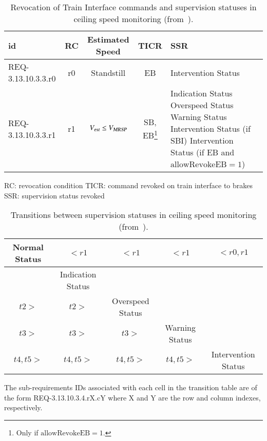 \begin{table}[htdp]
\caption{Revocation of Train Interface commands and supervision statuses in ceiling speed monitoring (from~\cite[Table~6]{ETCSSRS-Principles}).}
\footnotesize
\begin{minipage}{\textwidth}
\begin{center}
\begin{tabular}{|l|c|c|c|p{4cm}|}
\hline\hline
{\bf id} & {\bf RC} & {\bf Estimated Speed} & {\bf TICR} & {\bf SSR}
\\\hline\hline
REQ-3.13.10.3.3.r0 & r0 & Standstill & EB & Intervention Status
\\\hline
REQ-3.13.10.3.3.r1 & r1 & ${V_{\text{\sl est}}} \le {V_{\text{\sl MRSP}}}$ & SB, EB\footnote{Only if $\text{allowRevokeEB} = 1$.} &
Indication Status \newline
Overspeed Status \newline
Warning Status \newline
Intervention Status (if SBI) \newline
Intervention Status (if EB and $\text{allowRevokeEB} = 1$)
\\\hline\hline
\end{tabular}
\end{center}
\end{minipage}
\normalsize

\medskip
RC: revocation condition \newline
TICR: command revoked on train interface to brakes \newline
SSR: supervision status revoked
\label{tab:six}
\end{table}%



\begin{table}[htdp]
\caption{Transitions between supervision statuses in ceiling speed
  monitoring (from~\cite[Table~7]{ETCSSRS-Principles}).}
\begin{center}
\footnotesize
\begin{tabular}{|c|c|c|c|c|}
\hline\hline
Normal Status & $< r1$ & $< r1$ & $< r1$ & $< r0,r1$
\\\hline
 & Indication Status & & & 
 \\\hline
 $t2 >$ & $t2 > $ & Overspeed Status & & 
 \\\hline
 $t3 >$ &  $t3 >$ &  $t3 >$ & Warning Status &
 \\\hline
 $t4,t5 >$ &  $t4,t5 >$ & $t4,t5 >$ & $t4,t5 >$ & Intervention Status
\\\hline\hline
\end{tabular}
\end{center}

\smallskip
 The
  sub-requirements IDs associated with each cell in the transition table
   are of the form  REQ-3.13.10.3.4.rX.cY where X and Y
  are the row and   column indexes, respectively. 
\normalsize
\label{tab:seven}
\end{table}%



